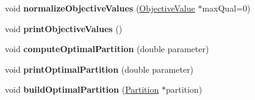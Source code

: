 \begin{DoxyCompactItemize}
\item 
\hypertarget{classHHNode_ab633b4f761f69ccd90c008a3cd9e2af8}{void {\bfseries normalize\-Objective\-Values} (\hyperlink{classObjectiveValue}{Objective\-Value} $\ast$max\-Qual=0)}\label{classHHNode_ab633b4f761f69ccd90c008a3cd9e2af8}

\item 
\hypertarget{classHHNode_ae2fcb4d041f2fd8b36b8d7684fb6afce}{void {\bfseries print\-Objective\-Values} ()}\label{classHHNode_ae2fcb4d041f2fd8b36b8d7684fb6afce}

\item 
\hypertarget{classHHNode_ad5336d55619a2edf10c0eea7ad8d2554}{void {\bfseries compute\-Optimal\-Partition} (double parameter)}\label{classHHNode_ad5336d55619a2edf10c0eea7ad8d2554}

\item 
\hypertarget{classHHNode_a2c5e2be5a313b0e39aea2a21de3e4141}{void {\bfseries print\-Optimal\-Partition} (double parameter)}\label{classHHNode_a2c5e2be5a313b0e39aea2a21de3e4141}

\item 
\hypertarget{classHHNode_abbb1d78e16be3e35bad3631394a0b072}{void {\bfseries build\-Optimal\-Partition} (\hyperlink{classPartition}{Partition} $\ast$partition)}\label{classHHNode_abbb1d78e16be3e35bad3631394a0b072}

\end{DoxyCompactItemize}
